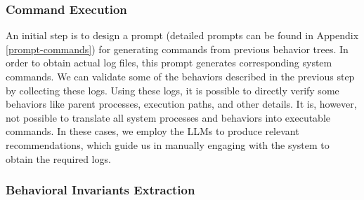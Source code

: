 \subsubsection{Command Execution}

An initial step is to design a prompt (detailed prompts can be found in Appendix \ref{prompt-commands}) for generating commands from previous behavior trees. In order to obtain actual log files, this prompt generates corresponding system commands. We can validate some of the behaviors described in the previous step by collecting these logs. Using these logs, it is possible to directly verify some behaviors like parent processes, execution paths, and other details. It is, however, not possible to translate all system processes and behaviors into executable commands. In these cases, we employ the LLMs to produce relevant recommendations, which guide us in manually engaging with the system to obtain the required logs.

\subsubsection{Behavioral Invariants Extraction}\label{sec:BIE}

